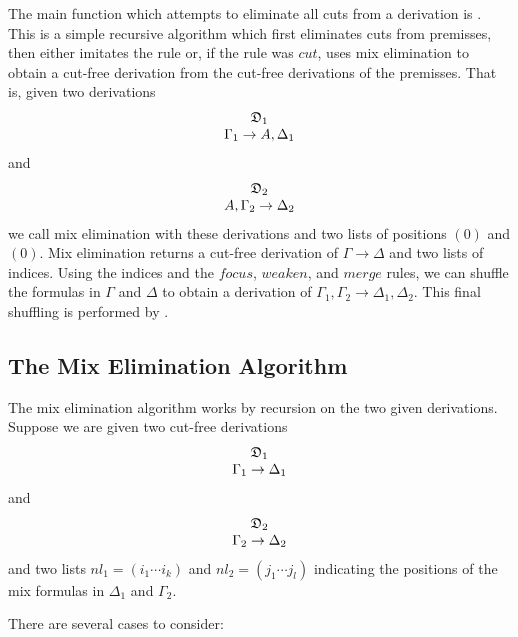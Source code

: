 The main function which attempts to eliminate all cuts from
a derivation is .
This is a simple recursive algorithm which first eliminates
cuts from premisses, then either imitates the rule
or, if the rule was $cut$, uses mix elimination to obtain
a cut-free derivation from the cut-free derivations of the
premisses.  That is,
given two derivations
$$\begin{array}[b]{c}\relax {\mathfrak D}_1\\ \relax \Gamma_1\rightarrow A,\Delta_1\end{array}$$
and
$$\begin{array}[b]{c}\relax {\mathfrak D}_2\\ \relax A,\Gamma_2\rightarrow \Delta_2\end{array}$$
we call mix elimination with these derivations
and two lists of positions $(0)$ and $(0)$.
Mix elimination returns a cut-free derivation of
$\Gamma\rightarrow\Delta$
and two lists of indices.
Using the indices and the $focus$, $weaken$, and $merge$ rules, we can
shuffle the formulas in $\Gamma$ and $\Delta$
to obtain a derivation of
$\Gamma_1,\Gamma_2\rightarrow \Delta_1,\Delta_2$.
This final shuffling is performed by
.

\subsection{The Mix Elimination Algorithm}

The mix elimination algorithm works by recursion on the two
given derivations.  Suppose we are given two cut-free derivations
$$\begin{array}[b]{c}\relax {\mathfrak D}_1\\ \relax \Gamma_1\rightarrow \Delta_1\end{array}$$
and
$$\begin{array}[b]{c}\relax {\mathfrak D}_2\\ \relax \Gamma_2\rightarrow \Delta_2\end{array}$$
and two lists $nl_1 = (i_1\cdots i_k)$ and $nl_2 = (j_1\cdots j_l)$
indicating the positions of the mix formulas in $\Delta_1$
and $\Gamma_2$.

There are several cases to consider:

